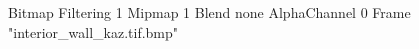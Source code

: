 {Bitmap
	{Filtering 1}
	{Mipmap 1}
	{Blend none}
	{AlphaChannel 0}
	{Frame "interior_wall_kaz.tif.bmp"}
}
